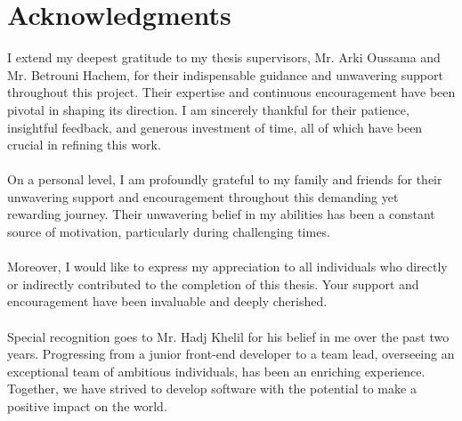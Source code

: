 \chapter*{Acknowledgments}

I extend my deepest gratitude to my thesis supervisors, Mr. Arki Oussama and Mr. Betrouni Hachem, for their indispensable guidance and unwavering support throughout this project. Their expertise and continuous encouragement have been pivotal in shaping its direction. I am sincerely thankful for their patience, insightful feedback, and generous investment of time, all of which have been crucial in refining this work.
\\
\\
On a personal level, I am profoundly grateful to my family and friends for their unwavering support and encouragement throughout this demanding yet rewarding journey. Their unwavering belief in my abilities has been a constant source of motivation, particularly during challenging times.
\\
\\
Moreover, I would like to express my appreciation to all individuals who directly or indirectly contributed to the completion of this thesis. Your support and encouragement have been invaluable and deeply cherished.
\\
\\
Special recognition goes to Mr. Hadj Khelil for his belief in me over the past two years. Progressing from a junior front-end developer to a team lead, overseeing an exceptional team of ambitious individuals, has been an enriching experience. Together, we have strived to develop software with the potential to make a positive impact on the world.